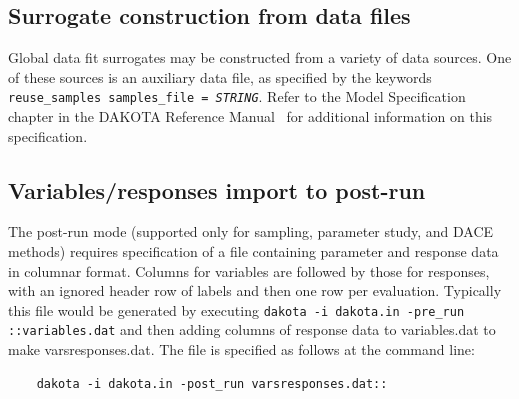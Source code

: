\subsection{Surrogate construction from data files}

Global data fit surrogates may be constructed from a variety of
data sources.  One of these sources is an auxiliary data file,
as specified by the keywords 
\texttt{reuse\_samples samples\_file = \emph{STRING}}.  Refer to the 
Model Specification chapter in the DAKOTA Reference 
Manual~\cite{RefMan} for additional information on this specification.

\subsection{Variables/responses import to post-run}

The post-run mode (supported only for sampling, parameter study, and
DACE methods) requires specification of a file containing parameter
and response data in columnar format.  Columns for variables are
followed by those for responses, with an ignored header row of labels
and then one row per evaluation.  Typically this file would be
generated by executing \texttt{dakota -i dakota.in -pre\_run
::variables.dat} and then adding columns of response data to
variables.dat to make varsresponses.dat.  The file is specified as
follows at the command line:
\begin{small}
\begin{verbatim}
    dakota -i dakota.in -post_run varsresponses.dat::
\end{verbatim}
\end{small}

